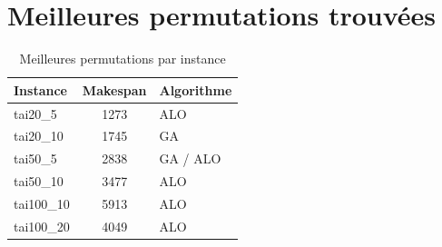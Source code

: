 \documentclass[12pt,a4paper,twoside]{report}
\begin{document}
\section{Meilleures permutations trouvées}

\begin{table}[H]
\centering
{}
\caption{Meilleures permutations par instance}
\label{tab:best_perms}
\begin{tabular}{lcl}
\toprule
\rowcolor{TableHeader}
\color{white}Instance & \color{white}Makespan & \color{white}Algorithme \\
\midrule
tai20\_5   & 1273 & ALO \\
tai20\_10  & 1745 & GA \\
tai50\_5   & 2838 & GA / ALO \\
tai50\_10  & 3477 & ALO \\
tai100\_10 & 5913 & ALO \\
tai100\_20 & 4049 & ALO \\
\bottomrule
\end{tabular}
\end{table}
\end{document}
